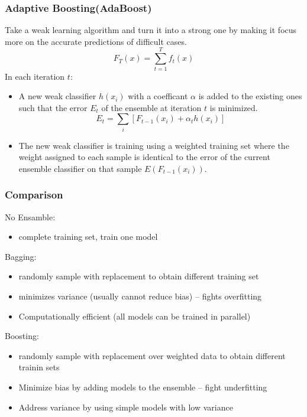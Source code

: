 \subsubsection*{Adaptive Boosting(AdaBoost)}
Take a weak learning algorithm and turn it into a strong one by making it focus more on the accurate predictions of difficult cases.
\[
F_T(x) = \sum_{t = 1}^{T}f_t(x)
\]
In each iteration \(t\):
\begin{itemize}
    \item A new weak classifier \(h(x_i)\) with a coefficant \(\alpha\) is added to the existing ones such that the error \(E_t\) of the ensemble at iteration \(t\) is minimized.
    \[
    E_t = \sum_{i}\left[F_{t-1}(x_i) + \alpha_t h(x_i)\right]
    \]
    \item The new weak classifier is training using a weighted training set where the weight assigned to each sample is identical to the error of the current ensemble classifier on that sample \(E(F_{t-1}(x_i))\).
\end{itemize}
\subsubsection{Comparison}
No Ensamble:
\begin{itemize}
    \item complete training set, train one model
\end{itemize}
Bagging:
\begin{itemize}
    \item randomly sample with replacement to obtain different training set
    \item minimizes variance (usually cannot reduce bias) -- fights overfitting
    \item Computationally efficient (all models can be trained in parallel)
\end{itemize}
Boosting:
\begin{itemize}
    \item randomly sample with replacement over weighted data to obtain different trainin sets
    \item Minimize bias by adding models to the ensemble -- fight underfitting
    \item Address variance by using simple models with low variance
\end{itemize}
